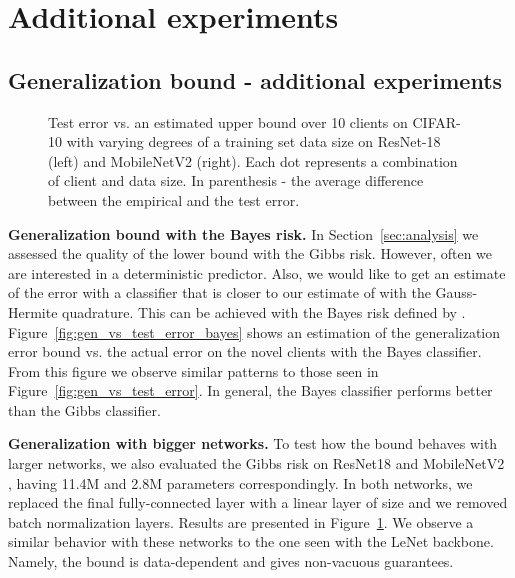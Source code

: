 \documentclass{article}
\def\Figref#1{Figure~\ref{#1}}
\def\Secref#1{Section~\ref{#1}}
\begin{document}
\section{Additional experiments} \label{sec:additional_exp}

\subsection{Generalization bound - additional experiments}


\begin{figure}[!t]
\centering
    \begin{subfigure}[ResNet-18]{
    \texttt{[image: figures/gibbs\_emp\_vs\_test\_error\_resnet.png]}
    }
    \end{subfigure}
\begin{subfigure}[MobileNetV2]{
    \texttt{[image: figures/gibbs\_emp\_vs\_test\_error\_mobilenet.png]}
    }
     \end{subfigure}
    \caption{Test error vs. an estimated upper bound over 10 clients on CIFAR-10 with varying degrees of a training set data size on ResNet-18 (left) and MobileNetV2 (right). Each dot represents a combination of client and data size. In parenthesis - the average difference between the empirical and the test error.}
    \label{fig:bound_larger_networks}
\end{figure}
\textbf{Generalization bound with the Bayes risk.} In \Secref{sec:analysis} we assessed the quality of the lower bound with the Gibbs risk. However, often we are interested in a deterministic predictor. Also, we would like to get an estimate of the error with a classifier that is closer to our estimate of  with the Gauss-Hermite quadrature. This can be achieved with the Bayes risk \cite{reeb2018learning} defined by . \Figref{fig:gen_vs_test_error_bayes} shows an estimation of the generalization error bound vs. the actual error on the novel clients with the Bayes classifier. From this figure we observe similar patterns to those seen in \Figref{fig:gen_vs_test_error}. In general, the Bayes classifier performs better than the Gibbs classifier.

\textbf{Generalization with bigger networks.} To test how the bound behaves with larger networks, we also evaluated the Gibbs risk on ResNet18 \cite{he2016deep} and MobileNetV2 \cite{sandler2018mobilenetv2}, having  11.4M and  2.8M parameters correspondingly. In both networks, we replaced the final fully-connected layer with a linear layer of size  and we removed batch normalization layers. Results are presented in \Figref{fig:bound_larger_networks}. We observe a similar behavior with these networks to the one seen with the LeNet backbone. Namely, the bound is data-dependent and gives non-vacuous guarantees.
\end{document}
